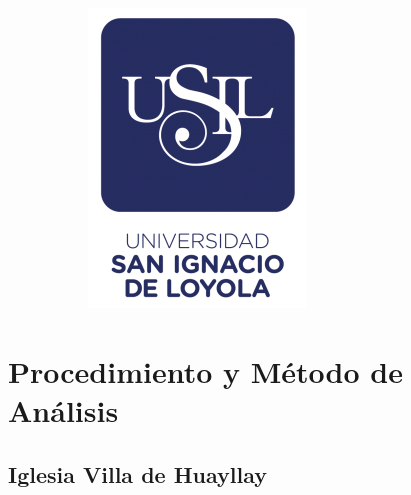 \documentclass[doc, 12pt, a4paper, draftall]{apa7} %
\begin{document}
\begin{figure}
\begin{subfigure}{0.4\textwidth}
      \includegraphics[width=\linewidth]{E_IMAGENES/0_Caratula/USIL LOGO.png}
      \label{fig:subfig2}
  \end{subfigure}
\end{figure}








\section{Procedimiento y Método de Análisis}

\subsection{Iglesia Villa de Huayllay}
  
\end{document}
